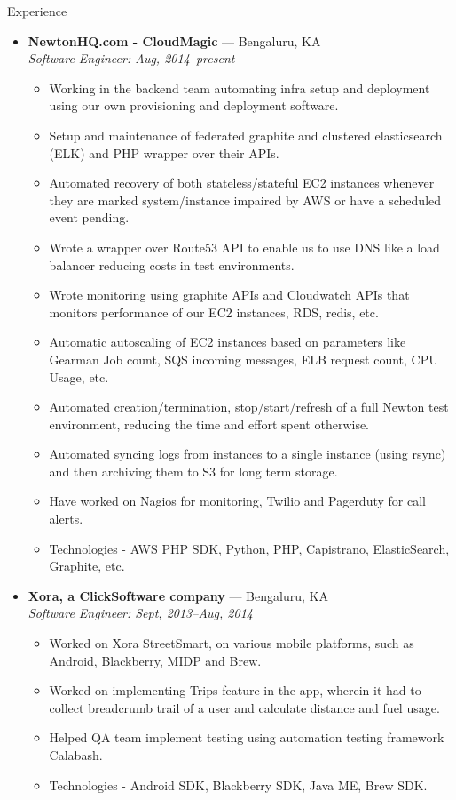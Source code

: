 \documentclass[a4paper,11pt,oneside]{article}
\newenvironment{ressection}[1]{
  \vspace{4pt}
         {\fontfamily{phv}\selectfont\Large#1}
         \begin{itemize}
           \vspace{3pt}
}{
         \end{itemize}
}
\newcommand{\ressubitem}[1]{
  \vspace{-1pt}
\item \begin{flushleft} #1 \end{flushleft}
}
\newcommand{\resbigitem}[3]{
  \vspace{-5pt}
\item
  \textbf{#1} --- #2 \\
  \textit{#3}
}
\newenvironment{ressubsec}[3]{
  \resbigitem{#1}{#2}{#3}
  \vspace{-2pt}
  \begin{itemize}
}{
  \end{itemize}
}
\begin{document}
\begin{ressection}{Experience}
  \begin{ressubsec}{NewtonHQ.com - CloudMagic}{Bengaluru, KA}{Software Engineer: Aug, 2014--present}
    \ressubitem{
      Working in the backend team automating infra setup
      and deployment using our own provisioning and deployment software.
    }
    \ressubitem{
      Setup and maintenance of federated graphite and
      clustered elasticsearch (ELK) and PHP wrapper over their APIs.
    }
    \ressubitem{
      Automated recovery of both stateless/stateful EC2 instances whenever they are marked
      system/instance impaired by AWS or have a scheduled event pending.
    }
    \ressubitem{
      Wrote a wrapper over Route53 API to enable us to use DNS like a load
      balancer reducing costs in test environments.
    }
    \ressubitem{
      Wrote monitoring using graphite APIs and Cloudwatch
      APIs that monitors performance of our EC2 instances, RDS, redis,
      etc.
    }
    \ressubitem{
      Automatic autoscaling of EC2 instances based on
      parameters like Gearman Job count, SQS incoming messages,
      ELB request count, CPU Usage, etc.
    }
    \ressubitem{
      Automated creation/termination, stop/start/refresh of a full Newton
      test environment, reducing the time and effort spent otherwise.
    }
    \ressubitem{
      Automated syncing logs from instances to a single
      instance (using rsync) and then archiving them
      to S3 for long term storage.
    }
    \ressubitem{
      Have worked on Nagios for monitoring, Twilio and Pagerduty for
      call alerts.
    }
    \ressubitem{
      Technologies - AWS PHP SDK, Python, PHP, Capistrano,
      ElasticSearch, Graphite, etc.
    }
  \end{ressubsec}
  \begin{ressubsec}{Xora, a ClickSoftware company}{Bengaluru, KA}{Software Engineer: Sept, 2013--Aug, 2014}
    \ressubitem{
      Worked on Xora StreetSmart, on various mobile platforms, such as
      Android, Blackberry, MIDP and Brew.
    }
    \ressubitem{
      Worked on implementing Trips feature in the app, wherein it had
      to collect breadcrumb trail of a user and calculate distance and
      fuel usage.
    }
    \ressubitem{
      Helped QA team implement testing using automation testing framework Calabash.
    }
    \ressubitem{
      Technologies - Android SDK, Blackberry SDK, Java ME, Brew SDK.
    }
  \end{ressubsec}

\end{ressection}
\end{document}
